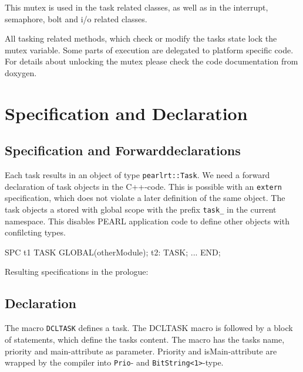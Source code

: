 This mutex is used in the task related classes, as well as in the interrupt,
semaphore, bolt and i/o related classes. 

All tasking related methods, which check or modify  the tasks state lock the 
mutex variable. Some parts of execution are delegated to platform specific
code. For details about unlocking the mutex please check the code
documentation from doxygen.



\section{Specification and Declaration}
\subsection{Specification and Forwarddeclarations}
Each task results in an object of type \verb|pearlrt::Task|.
We need a forward declaration of task objects in the C++-code. This is 
possible with an \verb|extern| specification, which does not violate a later
definition of the same object.
The task objects a stored with global scope with the prefix \verb|task_|
in the current namespace. 
This disables PEARL application code to define other objects with confilcting types.

\begin{PEARLCode}
SPC t1 TASK GLOBAL(otherModule);
t2: TASK;
  ...
END;
\end{PEARLCode}

Resulting specifications in the prologue:

\begin{CppCode}
} // close current namespace
namespace ns_otherModule {
   extern pearlrt::Task task_t1;
}
namespace ns_<currentModule> {

extern pearlrt::Task task_t2;
\end{CppCode}

\subsection{Declaration}
The macro \verb|DCLTASK| defines a task.
    The DCLTASK macro is followed
    by a block of statements, which define the tasks content.
    The macro has the tasks name, priority and main-attribute as
    parameter. 
    Priority and isMain-attribute are wrapped by the compiler 
    into \verb|Prio|- and \verb|BitString<1>|-type.

